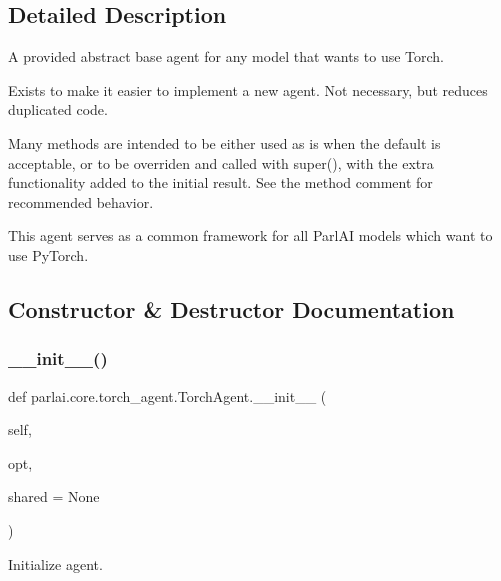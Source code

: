 \subsection{Detailed Description}
\begin{DoxyVerb}A provided abstract base agent for any model that wants to use Torch.

Exists to make it easier to implement a new agent.
Not necessary, but reduces duplicated code.

Many methods are intended to be either used as is when the default is
acceptable, or to be overriden and called with super(), with the extra
functionality added to the initial result. See the method comment for
recommended behavior.

This agent serves as a common framework for all ParlAI models which want
to use PyTorch.
\end{DoxyVerb}
 

\subsection{Constructor \& Destructor Documentation}
\mbox{\label{classparlai_1_1core_1_1torch__agent_1_1TorchAgent_ad0a00ada1fcd5b7ceec27b1a6cbdc281}} 
\subsubsection{\texorpdfstring{\+\_\+\+\_\+init\+\_\+\+\_\+()}{\_\_init\_\_()}}
{\footnotesize\ttfamily def parlai.\+core.\+torch\+\_\+agent.\+Torch\+Agent.\+\_\+\+\_\+init\+\_\+\+\_\+ (\begin{DoxyParamCaption}\item[{}]{self,  }\item[{}]{opt,  }\item[{}]{shared = {\ttfamily None} }\end{DoxyParamCaption})}

\begin{DoxyVerb}Initialize agent.
\end{DoxyVerb}
 

